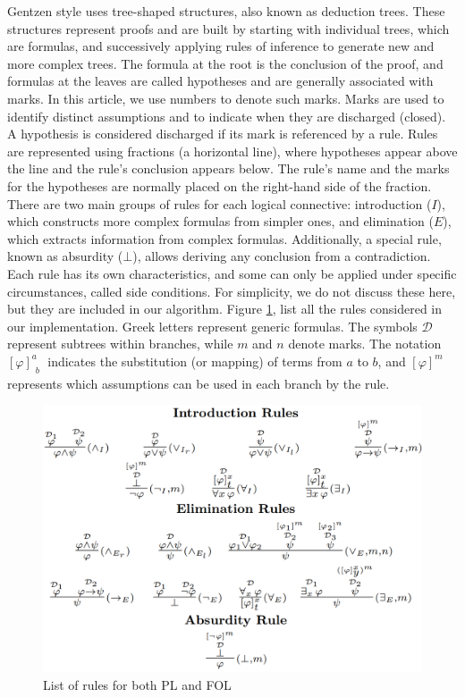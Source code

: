Gentzen style uses tree-shaped structures, also known as deduction trees. These structures represent proofs and are built by starting with individual trees, which are formulas, and successively applying rules of inference to generate new and more complex trees. The formula at the root is the conclusion of the proof, and formulas at the leaves are called hypotheses and are generally associated with marks. In this article, we use numbers to denote such marks. Marks are used to identify distinct assumptions and to indicate when they are discharged (closed). A hypothesis is considered discharged if its mark is referenced by a rule. Rules are represented using fractions (a horizontal line), where hypotheses appear above the line and the rule’s conclusion appears below. The rule’s name and the marks for the hypotheses are normally placed on the right-hand side of the fraction. There are two main groups of rules for each logical connective: introduction (\(I\)), which constructs more complex formulas from simpler ones, and elimination (\(E\)), which extracts information from complex formulas. Additionally, a special rule, known as absurdity (\(\bot\)), allows deriving any conclusion from a contradiction. Each rule has its own characteristics, and some can only be applied under specific circumstances, called side conditions. For simplicity, we do not discuss these here, but they are included in our algorithm. Figure \ref{fig:nd-rules}, list all the rules considered in our implementation. Greek letters represent generic formulas. The symbols \( \mathcal{D} \) represent subtrees within branches, while \( m \) and \( n \) denote marks. The notation \(\displaystyle \left[ \varphi \right]^a_{\substack{b}}\) indicates the substitution (or mapping) of terms from \( a \) to \( b \), and \(\displaystyle [\varphi]^m\) represents which assumptions can be used in each branch by the rule.

\begin{figure}
    \centering
    \includegraphics[width=1\linewidth]{resources/rules.png}
    \caption{List of rules for both PL and FOL}
    \label{fig:nd-rules}
\end{figure}

